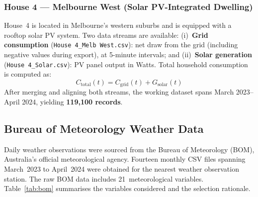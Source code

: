 \documentclass[12pt,a4paper]{article}
\begin{document}
\subsubsection{House 4 --- Melbourne West (Solar PV-Integrated Dwelling)}

House~4 is located in Melbourne's western suburbs and is equipped with a
rooftop solar PV system. Two data streams are available:
(i)~\textbf{Grid consumption} (\texttt{House 4\_Melb West.csv}): net draw from
the grid (including negative values during export), at 5-minute intervals; and
(ii)~\textbf{Solar generation} (\texttt{House 4\_Solar.csv}): PV panel output
in Watts. Total household consumption is computed as:
\begin{equation}
  C_{\text{total}}(t) = C_{\text{grid}}(t) + G_{\text{solar}}(t)
  \label{eq:total_consumption}
\end{equation}
After merging and aligning both streams, the working dataset spans March
2023--April 2024, yielding \textbf{119,100 records}.

\subsection{Bureau of Meteorology Weather Data}

Daily weather observations were sourced from the Bureau of Meteorology (BOM),
Australia's official meteorological agency. Fourteen monthly CSV files spanning
March~2023 to April~2024 were obtained for the nearest weather observation
station. The raw BOM data includes 21~meteorological variables. Table~\ref{tab:bom}
summarises the variables considered and the selection rationale.
\end{document}
